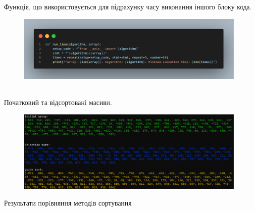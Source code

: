 \documentclass[a4paper,12pt]{article}
\begin{document}
\newpage
    Функція, що використовується для підрахунку часу виконання іншого блоку кода.
    \begin{figure}[h!]
        \begin{minipage}[h]{1\linewidth}
            \centering
            \includegraphics[width=1\linewidth]{Prt sc/Figure_5.png}
        \end{minipage}
    \end{figure} \\
    Початковий та відсортовані масиви.
    \begin{figure}[h!]
        \begin{minipage}[h]{1\linewidth}
            \centering
            \includegraphics[width=1\linewidth]{Prt sc/Figure_6.png}
        \end{minipage}
    \end{figure}

\newpage
{}
    \begin{center}
        \Large{Результати порiвняння методiв сортування}
    \end{center}
    
\end{document}
